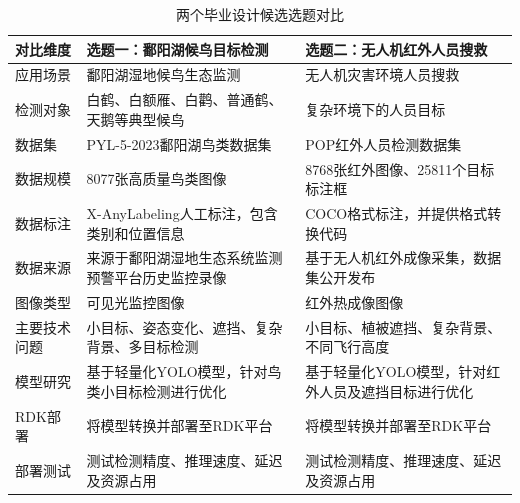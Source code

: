 \begin{table}[htbp]
    \centering
    \caption{两个毕业设计候选选题对比}
    \label{tab:topic_comparison}
    \renewcommand{\arraystretch}{1.4}
    \setlength{\tabcolsep}{6pt}

    \begin{tabularx}{\textwidth}{
        >{\centering\arraybackslash}p{2.4cm}
        >{\raggedright\arraybackslash}X
        >{\raggedright\arraybackslash}X
    }

        \hline
        \textbf{对比维度}
        & \textbf{选题一：鄱阳湖候鸟目标检测}
        & \textbf{选题二：无人机红外人员搜救} \\
        \hline

        应用场景
        & 鄱阳湖湿地候鸟生态监测
        & 无人机灾害环境人员搜救 \\

        检测对象
        & 白鹤、白额雁、白鹳、普通鹤、天鹅等典型候鸟
        & 复杂环境下的人员目标 \\

        数据集
        & PYL-5-2023鄱阳湖鸟类数据集
        & POP红外人员检测数据集 \\

        数据规模
        & 8077张高质量鸟类图像
        & 8768张红外图像、25811个目标标注框 \\

        数据标注
        & X-AnyLabeling人工标注，包含类别和位置信息
        & COCO格式标注，并提供格式转换代码 \\

        数据来源
        & 来源于鄱阳湖湿地生态系统监测预警平台历史监控录像
        & 基于无人机红外成像采集，数据集公开发布 \\

        图像类型
        & 可见光监控图像
        & 红外热成像图像 \\

        主要技术问题
        & 小目标、姿态变化、遮挡、复杂背景、多目标检测
        & 小目标、植被遮挡、复杂背景、不同飞行高度 \\

        模型研究
        & 基于轻量化YOLO模型，针对鸟类小目标检测进行优化
        & 基于轻量化YOLO模型，针对红外人员及遮挡目标进行优化 \\

        RDK部署
        & 将模型转换并部署至RDK平台
        & 将模型转换并部署至RDK平台 \\

        部署测试
        & 测试检测精度、推理速度、延迟及资源占用
        & 测试检测精度、推理速度、延迟及资源占用 \\


\end{tabularx}
\end{table}
